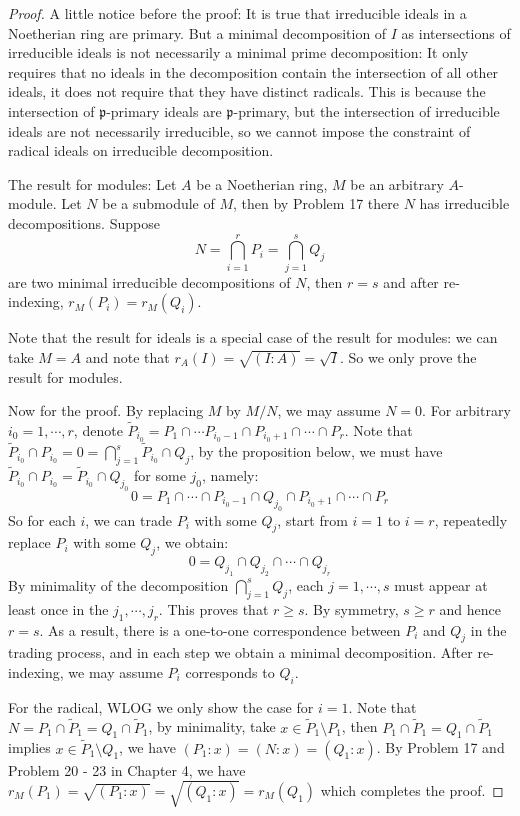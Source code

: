\documentclass{solution}
\begin{document}
\begin{proof}
    {\color{red} A little notice before the proof: It is true that irreducible ideals in a Noetherian ring are primary. But a minimal decomposition of $I$ as intersections of irreducible ideals is not necessarily a minimal prime decomposition: It only requires that no ideals in the decomposition contain the intersection of all other ideals, it does not require that they have distinct radicals. This is because the intersection of $\mathfrak{p}$-primary ideals are $\mathfrak{p}$-primary, but the intersection of irreducible ideals are not necessarily irreducible, so we cannot impose the constraint of radical ideals on irreducible decomposition.}

    The result for modules: Let $A$ be a Noetherian ring, $M$ be an arbitrary $A$-module. Let $N$ be a submodule of $M$, then by Problem 17 there $N$ has irreducible decompositions. Suppose
    $$N = \bigcap\limits_{i = 1}^{r} P_i = \bigcap\limits_{j = 1}^{s} Q_j$$
    are two minimal irreducible decompositions of $N$, then $r = s$ and after re-indexing, $r_M(P_i) = r_M(Q_i)$.

    Note that the result for ideals is a special case of the result for modules: we can take $M = A$ and note that $r_A(I) = \sqrt{(I : A)} = \sqrt{I}$. So we only prove the result for modules.

    Now for the proof. By replacing $M$ by $M / N$, we may assume $N = 0$.  For arbitrary $i_0 = 1, \cdots, r$, denote $\tilde{P}_{i_0} = P_1 \cap \cdots P_{i_0 - 1} \cap P_{i_0 + 1} \cap \cdots \cap P_r$. Note that $\tilde{P}_{i_0} \cap P_{i_0} = 0 = \bigcap\limits_{j = 1}^{s} \tilde{P}_{i_0} \cap Q_j$, by the proposition below, we must have $\tilde{P}_{i_0} \cap P_{i_0} = \tilde{P}_{i_0} \cap Q_{j_0}$ for some $j_0$, namely:
    $$0 = P_1 \cap \cdots \cap P_{i_0 - 1} \cap Q_{j_0} \cap P_{i_0 + 1} \cap \cdots \cap P_{r}$$
    So for each $i$, we can trade $P_i$ with some $Q_j$, start from $i = 1$ to $i = r$, repeatedly replace $P_i$ with some $Q_{j}$, we obtain:
    $$0 = Q_{j_1} \cap Q_{j_2} \cap \cdots \cap Q_{j_r}$$
    By minimality of the decomposition $\bigcap\limits_{j = 1}^{s} Q_j$, each $j = 1, \cdots, s$ must appear at least once in the $j_1, \cdots, j_r$. This proves that $r \ge s$. By symmetry, $s \ge r$ and hence $r = s$. As a result, there is a one-to-one correspondence between $P_i$ and $Q_j$ in the trading process, and in each step we obtain a minimal decomposition. After re-indexing, we may assume $P_i$ corresponds to $Q_i$.

    For the radical, WLOG we only show the case for $i = 1$. Note that $N = P_1 \cap \tilde{P}_1 = Q_1 \cap \tilde{P}_1$, by minimality, take $x \in \tilde{P}_1 \setminus P_1$, then $P_1 \cap \tilde{P}_1 = Q_1 \cap \tilde{P}_1$ implies $x \in \tilde{P}_1 \setminus Q_1$, we have $(P_1 : x) = (N : x) = (Q_1 : x)$. By Problem 17 and Problem 20 - 23 in Chapter 4, we have $r_M(P_1) = \sqrt{(P_1 : x)} = \sqrt{(Q_1 : x)} = r_M(Q_1)$
    which completes the proof.
\end{proof}
\end{document}
